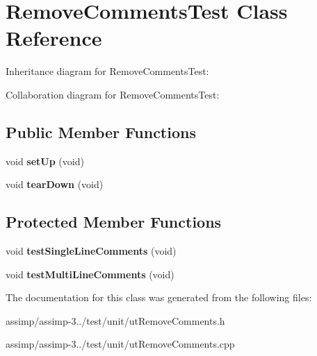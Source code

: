 \hypertarget{class_remove_comments_test}{\section{Remove\+Comments\+Test Class Reference}
\label{class_remove_comments_test}
}


Inheritance diagram for Remove\+Comments\+Test\+:


Collaboration diagram for Remove\+Comments\+Test\+:
\subsection*{Public Member Functions}
\begin{DoxyCompactItemize}
\item 
\hypertarget{class_remove_comments_test_ac0f802fc2d89c8a4f58936c3411ca5a3}{void {\bfseries set\+Up} (void)}\label{class_remove_comments_test_ac0f802fc2d89c8a4f58936c3411ca5a3}

\item 
\hypertarget{class_remove_comments_test_a8e0b0d8ccc72e860148fca729d0c441e}{void {\bfseries tear\+Down} (void)}\label{class_remove_comments_test_a8e0b0d8ccc72e860148fca729d0c441e}

\end{DoxyCompactItemize}
\subsection*{Protected Member Functions}
\begin{DoxyCompactItemize}
\item 
\hypertarget{class_remove_comments_test_a8e722e5226a167d3c47684d24ea920ef}{void {\bfseries test\+Single\+Line\+Comments} (void)}\label{class_remove_comments_test_a8e722e5226a167d3c47684d24ea920ef}

\item 
\hypertarget{class_remove_comments_test_aa20a5937a9797082c33cd3cac71fa7cc}{void {\bfseries test\+Multi\+Line\+Comments} (void)}\label{class_remove_comments_test_aa20a5937a9797082c33cd3cac71fa7cc}

\end{DoxyCompactItemize}


The documentation for this class was generated from the following files\+:\begin{DoxyCompactItemize}
\item 
assimp/assimp-\/3../test/unit/ut\+Remove\+Comments.\+h\item 
assimp/assimp-\/3../test/unit/ut\+Remove\+Comments.\+cpp\end{DoxyCompactItemize}
